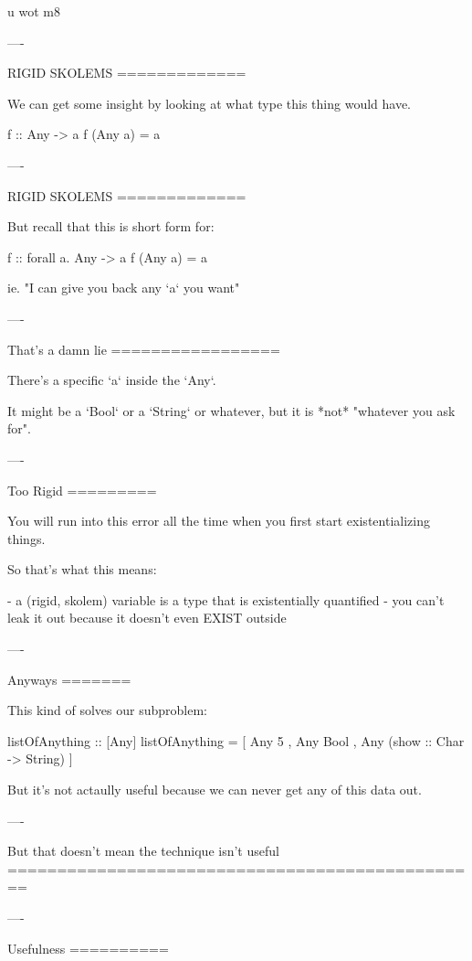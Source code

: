 u wot m8

----

RIGID SKOLEMS
=============

We can get some insight by looking at what type this thing would have.

\begin{hs}
  f :: Any -> a
  f (Any a) = a
\end{hs}

----

RIGID SKOLEMS
=============

But recall that this is short form for:

\begin{hs}
  f :: forall a. Any -> a
  f (Any a) = a
\end{hs}

ie. "I can give you back any `a` you want"

----

That's a damn lie
=================

There's a specific `a` inside the `Any`.

It might be a `Bool` or a `String` or whatever, but it is *not* "whatever you ask for".

----

Too Rigid
=========

You will run into this error all the time when you first start existentializing things.

So that's what this means:

- a (rigid, skolem) variable is a type that is existentially quantified
- you can't leak it out because it doesn't even EXIST outside

----

Anyways
=======

This kind of solves our subproblem:

\begin{hs}
  listOfAnything :: [Any]
  listOfAnything = [ Any 5
                   , Any Bool
                   , Any (show :: Char -> String)
                   ]
\end{hs}

But it's not actaully useful because we can never get any of this data out.

----

But that doesn't mean the technique isn't useful
================================================

----

Usefulness
==========

